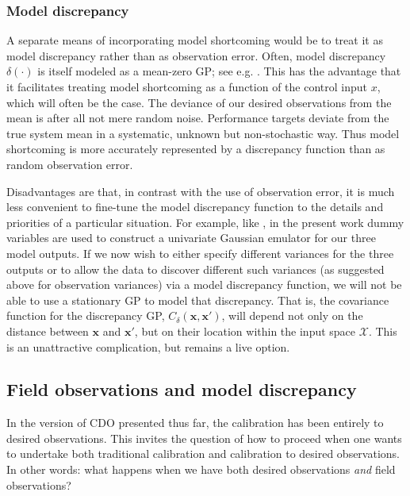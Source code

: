 \documentclass{article}
\begin{document}

\subsubsection{Model discrepancy}\label{mod_disc}

A separate means of incorporating model shortcoming would be to treat it as model discrepancy rather than as observation error. Often, model discrepancy $\delta(\cdot)$ is itself modeled as a mean-zero GP; see e.g. \cite{Williams2006}. This has the advantage that it facilitates treating model shortcoming as a function of the control input $x$, which will often be the case. The deviance of our desired observations from the mean is after all not mere random noise. Performance targets deviate from the true system mean in a systematic, unknown but non-stochastic way. Thus model shortcoming is more accurately represented by a discrepancy function than as random observation error.

Disadvantages are that, in contrast with the use of observation error, it is much less convenient to fine-tune the model discrepancy function to the details and priorities of a particular situation. For example, like \cite{Williams2006}, in the present work dummy variables are used to construct a univariate Gaussian emulator for our three model outputs. If we now wish to either specify different variances for the three outputs or to allow the data to discover different such variances (as suggested above for observation variances) via a model discrepancy function, we will not be able to use a stationary GP to model that discrepancy. That is, the covariance function for the discrepancy GP, $C_\delta(\mathbf x,\mathbf x')$, will depend not only on the distance between $\mathbf x$ and $\mathbf x'$, but on their location within the input space $\mathcal X$. This is an unattractive complication, but remains a live option.

\subsection{Field observations and model discrepancy}

In the version of CDO presented thus far, the calibration has been entirely to desired observations. This invites the question of how to proceed when one wants to undertake both traditional calibration and calibration to desired observations. In other words: what happens when we have both desired observations \emph{and} field observations? 
\end{document}
